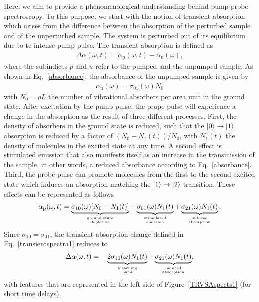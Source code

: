 Here, we aim to provide a phenomenological understanding behind pump-probe spectroscopy. To this purpose, we start with the notion of transient absorption which arises from the difference between the absorption of the perturbed sample and of the unperturbed sample. The system is perturbed out of its equilibrium due to te intense pump pulse. The transient absorption is defined as
\begin{eqnarray}
\Delta \alpha (\omega,t) = \alpha_\text{p} (\omega,t) - \alpha_\text{u}(\omega),
\label{transientspectra1}
\end{eqnarray} 
where the subindices $p$ and $u$ refer to the pumped and the unpumped sample. As shown in Eq.\ \ref{absorbance}, the absorbance of the unpumped sample is given by
\begin{eqnarray}
\alpha_\text{u} (\omega) = \sigma_{01} (\omega) N_0
\end{eqnarray}
with $N_0 = \rho L$ the number of vibrational absorbers per area unit in the ground state. After excitation by the pump pulse, the prope pulse will experience a change in the absorption as the result of three different processes. First, the density of absorbers in the ground state is reduced, such that the $\ket{0} \to \ket{1}$ absorption is reduced by a factor of $(N_0-N_1(t))/N_0$, with $N_1(t)$ the density of molecules in the excited state at any time. A second effect is stimulated emission that also manifests itself as an increase in the transmission of the sample, in other words, a reduced absorbance according to Eq.\ \ref{absorbance}. Third, the probe pulse can promote molecules from the first to the second excited state which induces an absorption matching the $\ket{1} \to \ket{2}$ transition. These effects can be represented as follows
\begin{eqnarray}
\alpha_\text{p} (\omega,t) = \underbrace{\sigma_{10} (\omega) [N_0 - N_1(t)]}_{\text{ground state} \atop \text{depletion}}  - \underbrace{\sigma_{01} (\omega) N_1(t)}_{\text{stimulated} \atop \text{emission}} + \underbrace{\sigma_{21} (\omega) N_1 (t)}_{\text{induced} \atop \text{absorption}}.
\end{eqnarray}
Since $\sigma_{10} = \sigma_{01}$, the transient absorption change defined in Eq.\ \ref{transientspectra1} reduces to
\begin{eqnarray}
\Delta \alpha (\omega,t) = - \underbrace{ 2 \sigma_{10} (\omega) N_1(t)}_{\text{bleaching} \atop \text{band}} + \underbrace{\sigma_{21} (\omega) N_1 (t)}_{\text{induced} \atop \text{absorption}}, 
\label{transientabs2}
\end{eqnarray}
with features that are represented in the left side of Figure~\ref{TRVSAspects1} (for short time delays).


